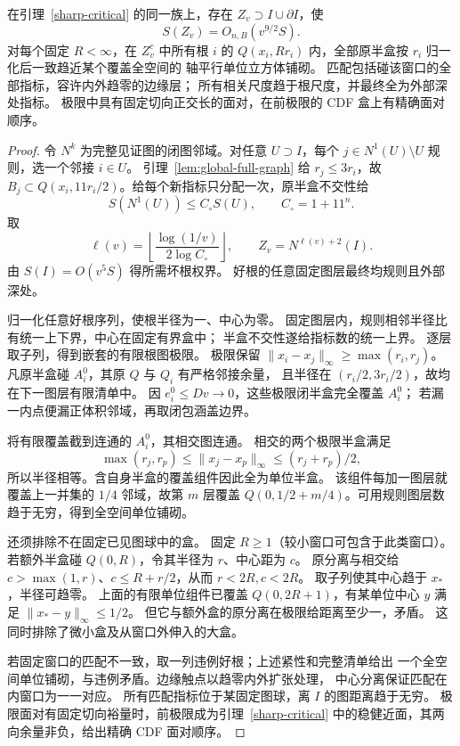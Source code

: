 \begin{lemma}[全部尺度的局部匹配]\label{sharp-input-tiling}
在引理~\ref{sharp-critical} 的同一族上，存在
\(Z_v\supset I\cup\partial I\)，使
\[
 S(Z_v)=O_{n,B}(v^{9/2}S).
\]
对每个固定 \(R<\infty\)，在 \(Z_v^c\) 中所有根 \(i\) 的
\(Q(x_i,Rr_i)\) 内，全部原半盒按 \(r_i\) 归一化后一致趋近某个覆盖全空间的
轴平行单位立方体铺砌。
匹配包括碰该窗口的全部指标，容许内外趋零的边缘层；
所有相关尺度趋于根尺度，并最终全为外部深处指标。
极限中具有固定切向正交长的面对，在前极限的 CDF 盒上有精确面对顺序。
\end{lemma}
\begin{proof}
令 \(N^k\) 为完整见证图的闭图邻域。对任意 \(U\supset I\)，每个
\(j\in N^1(U)\setminus U\) 规则，选一个邻接 \(i\in U\)。
引理~\ref{lem:global-full-graph} 给 \(r_j\le3r_i\)，故
\(B_j\subset Q(x_i,11r_i/2)\)。给每个新指标只分配一次，原半盒不交性给
\[
 S(N^1(U))\le C_\circ S(U),\qquad C_\circ=1+11^n.
\]
取
\[
 \ell(v)=\left\lfloor\frac{\log(1/v)}{2\log C_\circ}\right\rfloor,
 \qquad Z_v=N^{\ell(v)+2}(I).
\]
由 \(S(I)=O(v^5S)\) 得所需坏根权界。
好根的任意固定图层最终均规则且外部深处。

归一化任意好根序列，使根半径为一、中心为零。
固定图层内，规则相邻半径比有统一上下界，中心在固定有界盒中；
半盒不交性遂给指标数的统一上界。
逐层取子列，得到嵌套的有限根图极限。
极限保留
\(\|x_i-x_j\|_\infty\ge\max(r_i,r_j)\)。
凡原半盒碰 \(A_i^0\)，其原 \(Q\) 与 \(Q_i\) 有严格邻接余量，
且半径在 \((r_i/2,3r_i/2)\)，故均在下一图层有限清单中。
因 \(e_i^0\le Dv\to0\)，这些极限闭半盒完全覆盖 \(A_i^0\)；
若漏一内点便漏正体积邻域，再取闭包涵盖边界。

将有限覆盖截到连通的 \(A_i^0\)，其相交图连通。
相交的两个极限半盒满足
\[
 \max(r_j,r_p)\le\|x_j-x_p\|_\infty\le(r_j+r_p)/2,
\]
所以半径相等。含自身半盒的覆盖组件因此全为单位半盒。
该组件每加一图层就覆盖上一并集的 \(1/4\) 邻域，故第 \(m\) 层覆盖
\(Q(0,1/2+m/4)\)。可用规则图层数趋于无穷，得到全空间单位铺砌。

还须排除不在固定已见图球中的盒。
固定 \(R\ge1\)（较小窗口可包含于此类窗口）。
若额外半盒碰 \(Q(0,R)\)，令其半径为 \(r\)、中心距为 \(c\)。
原分离与相交给
\(c>\max(1,r)\)、\(c\le R+r/2\)，从而 \(r<2R,c<2R\)。
取子列使其中心趋于 \(x_*\)，半径可趋零。
上面的有限单位组件已覆盖 \(Q(0,2R+1)\)，有某单位中心 \(y\)
满足 \(\|x_*-y\|_\infty\le1/2\)。
但它与额外盒的原分离在极限给距离至少一，矛盾。
这同时排除了微小盒及从窗口外伸入的大盒。

若固定窗口的匹配不一致，取一列违例好根；上述紧性和完整清单给出
一个全空间单位铺砌，与违例矛盾。边缘触点以趋零内外扩张处理，
中心分离保证匹配在内窗口为一一对应。
所有匹配指标位于某固定图球，离 \(I\) 的图距离趋于无穷。
极限面对有固定切向裕量时，前极限成为引理~\ref{sharp-critical}
中的稳健近面，其两向余量非负，给出精确 CDF 面对顺序。
\end{proof}

